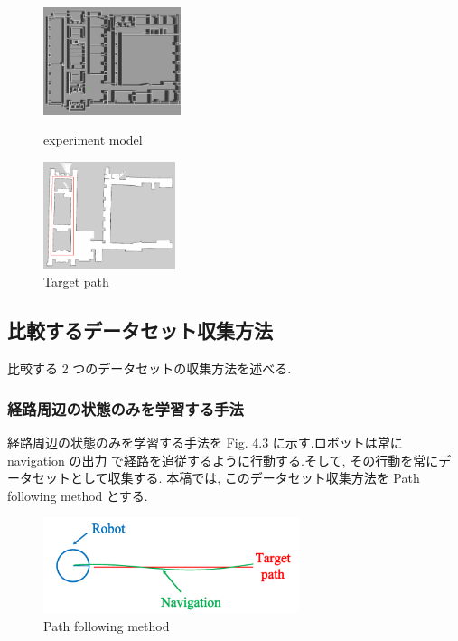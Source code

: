 \documentclass{jarticle}
\begin{document}
\begin{figure}[htbp]
  \begin{minipage}{0.5\hsize}
   \centering
   \includegraphics[width=40.1mm]{figs/gazebo.png}
   \caption{experiment model}
  \end{minipage}
  \begin{minipage}{0.5\hsize}
   \centering
   \includegraphics[width=38.5mm]{figs/rviz.png}
   \caption{Target path}
  \end{minipage}
 \end{figure}


\subsection{比較するデータセット収集方法}
比較する 2 つのデータセットの収集方法を述べる.\\

\subsubsection{経路周辺の状態のみを学習する手法}
経路周辺の状態のみを学習する手法を Fig. 4.3 に示す.ロボットは常に navigation の出力
で経路を追従するように行動する.そして, その行動を常にデータセットとして収集する.
本稿では, このデータセット収集方法を Path following method とする.

\begin{figure}[h!]
  \centering
   \includegraphics[height=28mm]{./figs/dl.png}
   \caption{Path following method}
\end{figure}
\end{document}
